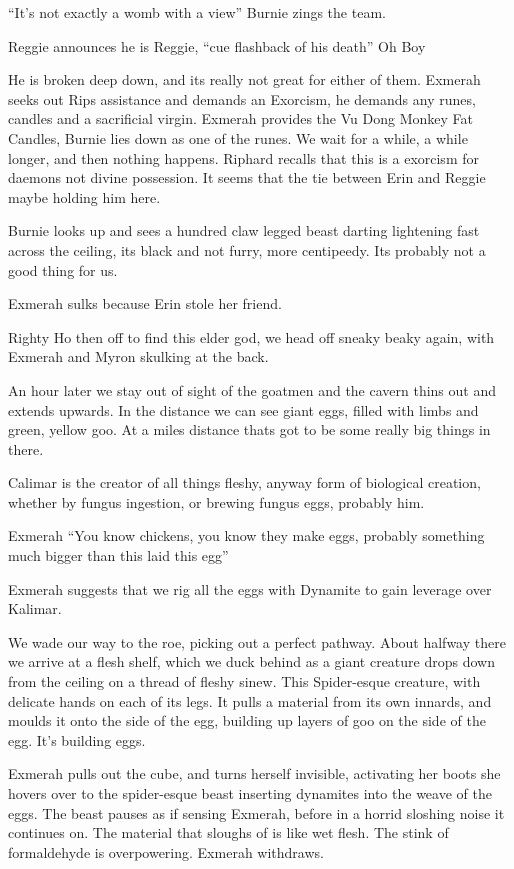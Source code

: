 “It’s not exactly a womb with a view” Burnie zings the team.\medskip

Reggie announces he is Reggie, “cue flashback of his death” Oh Boy\medskip

He is broken deep down, and its really not great for either of them. Exmerah seeks out Rips assistance and demands an Exorcism, he demands any runes, candles and a sacrificial virgin. Exmerah provides the Vu Dong Monkey Fat Candles, Burnie lies down as one of the runes. We wait for a while, a while longer, and then nothing happens. Riphard recalls that this is a exorcism for daemons not divine possession. It seems that the tie between Erin and Reggie maybe holding him here.\medskip

Burnie looks up and sees a hundred claw legged beast darting lightening fast across the ceiling, its black and not furry, more centipeedy. Its probably not a good thing for us.\medskip

Exmerah sulks because Erin stole her friend.\medskip

Righty Ho then off to find this elder god, we head off sneaky beaky again, with Exmerah and Myron skulking at the back.\medskip

An hour later we stay out of sight of the goatmen and the cavern thins out and extends upwards. In the distance we can see giant eggs, filled with limbs and green, yellow goo. At a miles distance thats got to be some really big things in there.\medskip

Calimar is the creator of all things fleshy, anyway form of biological creation, whether by fungus ingestion, or brewing fungus eggs, probably him.\medskip

Exmerah “You know chickens, you know they make eggs, probably something much bigger than this laid this egg”\medskip

Exmerah suggests that we rig all the eggs with Dynamite to gain leverage over Kalimar.\medskip

We wade our way to the roe, picking out a perfect pathway. About halfway there we arrive at a flesh shelf, which we duck behind as a giant creature drops down from the ceiling on a thread of fleshy sinew. This Spider-esque creature, with delicate hands on each of its legs. It pulls a material from its own innards, and moulds it onto the side of the egg, building up layers of goo on the side of the egg. It’s building eggs.\medskip

Exmerah pulls out the cube, and turns herself invisible, activating her boots she hovers over to the spider-esque beast inserting dynamites into the weave of the eggs. The beast pauses as if sensing Exmerah, before in a horrid sloshing noise it continues on. The material that sloughs of is like wet flesh. The stink of formaldehyde is overpowering. Exmerah withdraws.\medskip

